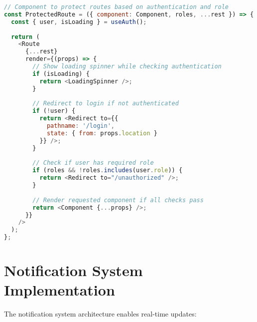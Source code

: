\documentclass[12pt,a4paper]{report}
\begin{document}
\begin{lstlisting}[language=JavaScript, caption=Protected Route Component]
// Component to protect routes based on authentication and role
const ProtectedRoute = ({ component: Component, roles, ...rest }) => {
  const { user, isLoading } = useAuth();
  
  return (
    <Route
      {...rest}
      render={(props) => {
        // Show loading spinner while checking authentication
        if (isLoading) {
          return <LoadingSpinner />;
        }
        
        // Redirect to login if not authenticated
        if (!user) {
          return <Redirect to={{
            pathname: '/login',
            state: { from: props.location }
          }} />;
        }
        
        // Check if user has required role
        if (roles && !roles.includes(user.role)) {
          return <Redirect to="/unauthorized" />;
        }
        
        // Render requested component if all checks pass
        return <Component {...props} />;
      }}
    />
  );
};
\end{lstlisting}

\section{Notification System Implementation}
The notification system architecture enables real-time updates:
\end{document}
